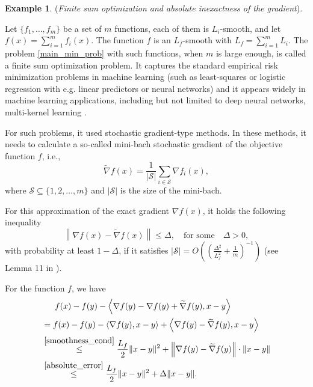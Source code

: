 \documentclass[11pt]{amsart}
\theoremstyle{definition}
\newtheorem{example}[theorem]{Example}
\numberwithin{equation}{section}
\begin{document}
\begin{example}\label{ex1_inexact}(\textit{Finite sum optimization and absolute inexactness of the gradient}).

Let $\{f_1, \ldots, f_m\}$ be a set of $m$ functions, each of them is $L_i$-smooth, and let $f(x) = \sum_{i = 1}^{m} f_i(x)$. The function $f$ is an $L_f$-smooth with $L_f=  \sum_{i = 1}^{m} L_i$. The problem \eqref{main_min_prob} with such functions, when $m$ is large enough, is called a finite sum optimization problem. It captures the standard empirical risk minimization problems in machine learning (such as least-squares or logistic regression with e.g. linear predictors or neural networks) \cite{Shwartz2014Understanding} and it appears widely in machine learning applications, including but not limited to deep neural networks, multi-kernel learning \cite{Arora2019Fine,Bottou2018machine,Brutzkus2018SGD,Zou2018Deep}. 

For such problems, it used stochastic gradient-type methods. In these methods, it needs to calculate a so-called mini-bach stochastic gradient of the objective function $f$, i.e.,
\[
    \widetilde{\nabla} f(x) = \frac{1}{|\mathcal{S}|} \sum_{i \in \mathcal{S}} \nabla f_i(x),
\]
where $\mathcal{S} \subseteq \{1, 2, \ldots, m\}$ and $|\mathcal{S}|$ is the size of the mini-bach. 

For this approximation of the exact gradient $\nabla f(x)$, it holds the following inequality
\begin{equation}\label{absolute_error}
   \left \|\nabla f(x) - \widetilde{\nabla} f(x)\right \| \leq \Delta, \quad \text{for some} \quad \Delta >0, 
\end{equation}
with probability at least $1 - \Delta$, if it satisfies $|\mathcal{S}| = O \left( \left(\frac{\Delta^2}{L_f^2} + \frac{1}{m}\right)^{-1}\right)$ (see Lemma 11 in \cite{Agafonov2023}). 

For the function $f$, we have 
\begin{align*}
   & \quad \;\;  f(x) - f(y) - \left \langle\nabla f(y) - \nabla f(y) +  \widetilde{\nabla} f(y)  , x - y \right \rangle  
   \\& = f(x) - f(y) - \left \langle\nabla f(y) , x - y \right \rangle + \left \langle\nabla f(y) -   \widetilde{\nabla} f(y)  , x - y \right \rangle 
   \\& \stackrel{\eqref{smoothness_cond}}{\leq} \frac{L_f}{2} \|x - y\|^2 + \left\|\nabla f(y) -   \widetilde{\nabla} f(y)\right \| \cdot \|x - y\|
   \\& \stackrel{\eqref{absolute_error}}{\leq} \frac{L_f}{2} \|x - y\|^2 + \Delta \|x - y\|.
\end{align*}


\end{example}
\end{document}
